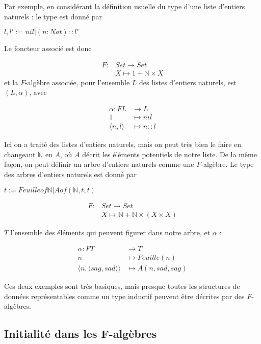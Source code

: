 \documentclass{article}
\newcommand{\N}{\mathbb{N}}
\begin{document}
Par exemple, en considérant la définition usuelle du type d'une liste d'entiers naturels : le type est donné par 
\begin{center}
$l,l' := nil | (n : Nat) :: l'$    
\end{center}
Le foncteur associé est donc

\begin{align*}
F : & Set \rightarrow Set \\       & X \mapsto 1 + \N \times X
\end{align*}
et la $F$-algèbre associée, pour l'ensemble $L$ des listes d'entiers naturels, est $(L,\alpha)$, avec 

\begin{align*}
\alpha :  FL &  \rightarrow L \\        1 & \mapsto nil  \\ 
      \langle n, l \rangle &\mapsto n :: l
\end{align*}

Ici on a traité des listes d'entiers naturels, mais on peut très bien le faire en changeant $\N$ en $A$, où $A$ décrit les éléments potentiels de notre liste. De la même façon, on peut définir un arbre d'entiers naturels comme une $F$-algèbre. Le type des arbres d'entiers naturels est donné par 
\begin{center}
    $t := Feuille of \N | A of ( \N , t, t)$
\end{center}

\begin{align*}
F : & Set \rightarrow Set \\       & X \mapsto \N + \N \times (X \times X)
\end{align*}

$T$ l'ensemble des éléments qui peuvent figurer dans notre arbre, et $\alpha$ : 

\begin{align*}
\alpha :  FT &  \rightarrow T \\        n & \mapsto Feuille(n)  \\ 
      \langle n, \langle sag, sad \rangle \rangle &\mapsto A (n, sad, sag)
\end{align*}

Ces deux exemples sont très basiques, mais presque toutes les structures de données représentables comme un type inductif peuvent être décrites par des $F$-algèbres. 

\subsection{Initialité dans les F-algèbres}
\end{document}
